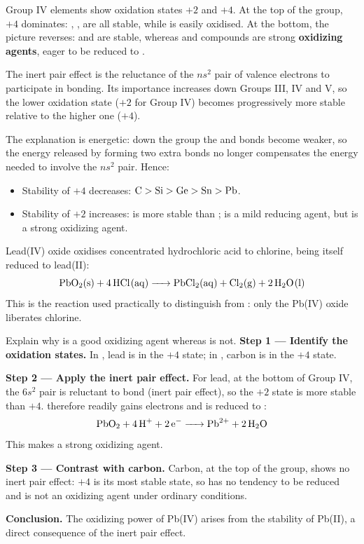 \documentclass[11pt]{article}
\newcommand{\cle}[1]{{\popxbold\color{popdark}#1}}
\begin{document}
Group IV elements show oxidation states $+2$ and $+4$. At the top of the group, $+4$ dominates: , ,  are all stable, while  is easily oxidised. At the bottom, the picture reverses:  and  are stable, whereas  and  compounds are strong \textbf{oxidizing agents}, eager to be reduced to .

\begin{definition}
The \cle{inert pair effect} is the reluctance of the $ns^2$ pair of valence electrons to participate in bonding. Its importance increases down Groups III, IV and V, so the lower oxidation state ($+2$ for Group IV) becomes progressively more stable relative to the higher one ($+4$).
\end{definition}

The explanation is energetic: down the group the  and  bonds become weaker, so the energy released by forming two extra bonds no longer compensates the energy needed to involve the $ns^2$ pair. Hence:

\begin{itemize}
\item Stability of $+4$ decreases: $\ce{C} > \ce{Si} > \ce{Ge} > \ce{Sn} > \ce{Pb}$.
\item Stability of $+2$ increases:  is more stable than ;  is a mild reducing agent, but  is a strong oxidizing agent.
\end{itemize}

\begin{exemplebox}
Lead(IV) oxide oxidises concentrated hydrochloric acid to chlorine, being itself reduced to lead(II):
\[ \ce{PbO2(s) + 4HCl(aq) -> PbCl2(aq) + Cl2(g) + 2H2O(l)} \]
This is the reaction used practically to distinguish  from : only the Pb(IV) oxide liberates chlorine.
\end{exemplebox}

\begin{exoresolu}
Explain why  is a good oxidizing agent whereas  is not.
\tcblower
\textbf{Step 1 — Identify the oxidation states.} In , lead is in the $+4$ state; in , carbon is in the $+4$ state.

\textbf{Step 2 — Apply the inert pair effect.} For lead, at the bottom of Group IV, the $6s^2$ pair is reluctant to bond (inert pair effect), so the $+2$ state is more stable than $+4$.  therefore readily gains electrons and is reduced to :
\[ \ce{PbO2 + 4H+ + 2e- -> Pb^{2+} + 2H2O} \]
This makes  a strong oxidizing agent.

\textbf{Step 3 — Contrast with carbon.} Carbon, at the top of the group, shows no inert pair effect: $+4$ is its most stable state, so  has no tendency to be reduced and is not an oxidizing agent under ordinary conditions.

\textbf{Conclusion.} The oxidizing power of Pb(IV) arises from the stability of Pb(II), a direct consequence of the inert pair effect.
\end{exoresolu}
\end{document}

